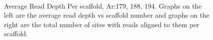 \documentclass[../main.tex]{subfiles}
\begin{document}
\begin{figure}[H]
\begin{centering}
		\\
		\begin{singlespace}
			\vspace{-0.5cm}		
			\caption[Average Read Depth Per scaffold, Ar:179, 188, 194]{Average Read Depth Per scaffold, Ar:179, 188, 194. Graphs on the left are the average read depth vs scaffold number and graphs on the right are the total number of sites with reads aligned to them per scaffold.}\label{avg_rd_graphs_4}
		\end{singlespace}	
	\end{centering}
\end{figure}
\end{document}

